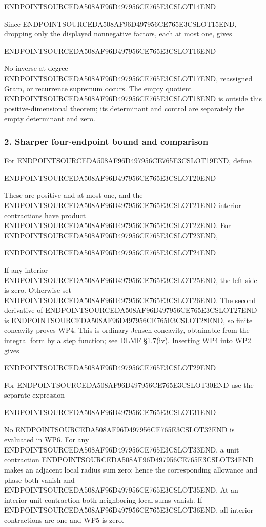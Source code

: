 ENDPOINTSOURCEDA508AF96D497956CE765E3CSLOT14END

Since ENDPOINTSOURCEDA508AF96D497956CE765E3CSLOT15END, dropping only the displayed nonnegative factors, each at most one, gives

ENDPOINTSOURCEDA508AF96D497956CE765E3CSLOT16END

No inverse at degree ENDPOINTSOURCEDA508AF96D497956CE765E3CSLOT17END, reassigned Gram, or recurrence supremum occurs. The empty quotient ENDPOINTSOURCEDA508AF96D497956CE765E3CSLOT18END is outside this positive-dimensional theorem; its determinant and control are separately the empty determinant and zero.

\subsubsection{2. Sharper four-endpoint bound and comparison}\label{endpoint-window_product_owner--sharper-four-endpoint-bound-and-comparison}

For ENDPOINTSOURCEDA508AF96D497956CE765E3CSLOT19END, define

ENDPOINTSOURCEDA508AF96D497956CE765E3CSLOT20END

These are positive and at most one, and the ENDPOINTSOURCEDA508AF96D497956CE765E3CSLOT21END interior contractions have product ENDPOINTSOURCEDA508AF96D497956CE765E3CSLOT22END. For ENDPOINTSOURCEDA508AF96D497956CE765E3CSLOT23END,

ENDPOINTSOURCEDA508AF96D497956CE765E3CSLOT24END

If any interior ENDPOINTSOURCEDA508AF96D497956CE765E3CSLOT25END, the left side is zero. Otherwise set ENDPOINTSOURCEDA508AF96D497956CE765E3CSLOT26END. The second derivative of ENDPOINTSOURCEDA508AF96D497956CE765E3CSLOT27END is ENDPOINTSOURCEDA508AF96D497956CE765E3CSLOT28END, so finite concavity proves WP4. This is ordinary Jensen concavity, obtainable from the integral form by a step function; see \href{https://dlmf.nist.gov/1.7.iv}{DLMF §1.7(iv)}. Inserting WP4 into WP2 gives

ENDPOINTSOURCEDA508AF96D497956CE765E3CSLOT29END

For ENDPOINTSOURCEDA508AF96D497956CE765E3CSLOT30END use the separate expression

ENDPOINTSOURCEDA508AF96D497956CE765E3CSLOT31END

No ENDPOINTSOURCEDA508AF96D497956CE765E3CSLOT32END is evaluated in WP6. For any ENDPOINTSOURCEDA508AF96D497956CE765E3CSLOT33END, a unit contraction ENDPOINTSOURCEDA508AF96D497956CE765E3CSLOT34END makes an adjacent local radius sum zero; hence the corresponding allowance and phase both vanish and ENDPOINTSOURCEDA508AF96D497956CE765E3CSLOT35END. At an interior unit contraction both neighboring local sums vanish. If ENDPOINTSOURCEDA508AF96D497956CE765E3CSLOT36END, all interior contractions are one and WP5 is zero.

